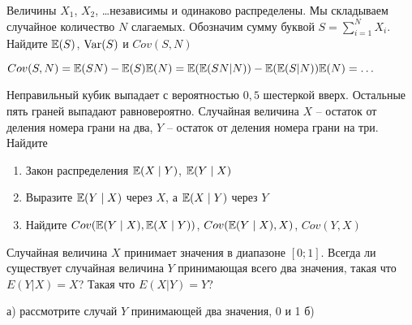 \begin{problem}
Величины $X_1$, $X_2$, \ldots независимы и одинаково распределены. Мы складываем случайное количество $N$ слагаемых. Обозначим сумму буквой $S=\sum_{i=1}^{N}X_i$. Найдите $\mathbb{E}(S)$, $\operatorname{Var}(S)$ и $Cov(S,N)$

\begin{sol}
 $Cov(S,N)=\mathbb{E}(SN)-\mathbb{E}(S)\mathbb{E}(N)=\mathbb{E}(\mathbb{E}(SN|N))-\mathbb{E}(\mathbb{E}(S|N))\mathbb{E}(N)=\ldots$
\end{sol}
\end{problem}

\begin{problem}
Неправильный кубик выпадает с вероятностью $0{,}5$ шестеркой вверх. Остальные пять граней выпадают равновероятно. Случайная величина $X$ -- остаток от деления номера грани на два, $Y$ -- остаток от деления номера грани на три. Найдите
\begin{enumerate}
\item Закон распределения $\mathbb{E}(X\mid Y)$, $\mathbb{E}(Y\mid X)$
\item Выразите $\mathbb{E}(Y\mid X)$ через $X$, а $\mathbb{E}(X\mid Y)$ через $Y$
\item Найдите $Cov(\mathbb{E}(Y\mid X),\mathbb{E}(X\mid Y))$, $Cov(\mathbb{E}(Y\mid X),X)$, $Cov(Y,X)$
\end{enumerate}

\begin{sol}

\end{sol}
\end{problem}

\begin{problem}
Случайная величина $X$ принимает значения в диапазоне $[0;1]$. Всегда ли существует случайная величина $Y$ принимающая всего два значения, такая что $E(Y|X)=X$? Такая что $E(X|Y)=Y$?

\begin{sol}
а) рассмотрите случай $Y$ принимающей два значения, 0 и 1 б)
\end{sol}
\end{problem}


